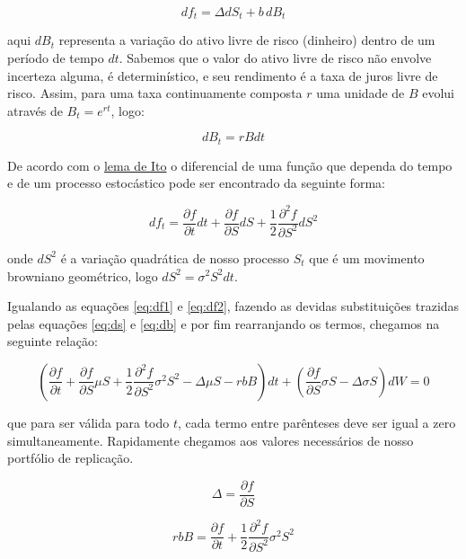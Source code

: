 \documentclass[]{book}
\begin{document}
\begin{equation}
df_t=\Delta dS_t+b\,dB_t 
\label{eq:df1}
\end{equation}

aqui \(dB_t\) representa a variação do ativo livre de risco (dinheiro)
dentro de um período de tempo \(dt\). Sabemos que o valor do ativo livre
de risco não envolve incerteza alguma, é determinístico, e seu
rendimento é a taxa de juros livre de risco. Assim, para uma taxa
continuamente composta \(r\) uma unidade de \(B\) evolui através de
\(B_t=e^{rt}\), logo:

\begin{equation}
dB_t=rBdt
\label{eq:db}
\end{equation}

De acordo com o
\href{https://pt.wikipedia.org/wiki/Lema_de_It\%C5\%8D}{lema de Ito} o
diferencial de uma função que dependa do tempo e de um processo
estocástico pode ser encontrado da seguinte forma:

\begin{equation}
df_t=\frac{\partial f}{\partial t}dt + \frac{\partial f}{\partial S}dS + \frac{1}{2}\frac{\partial^2 f}{\partial S^2}dS^2
\label{eq:df2}
\end{equation}

onde \(dS^2\) é a variação quadrática de nosso processo \(S_t\) que é um
movimento browniano geométrico, logo \(dS^2=\sigma^2S^2dt\).

Igualando as equações \eqref{eq:df1} e \eqref{eq:df2}, fazendo as devidas
substituições trazidas pelas equações \eqref{eq:ds} e \eqref{eq:db} e por
fim rearranjando os termos, chegamos na seguinte relação:

\begin{equation}
\left( \frac{\partial f}{\partial t} + \frac{\partial f}{\partial S}\mu S + \frac{1}{2}\frac{\partial^2 f}{\partial S^2}\sigma^2 S^2 - \Delta\mu S - rbB \right)dt + \left( \frac{\partial f}{\partial S}\sigma S - \Delta \sigma S \right)dW = 0 
\end{equation}

que para ser válida para todo \(t\), cada termo entre parênteses deve
ser igual a zero simultaneamente. Rapidamente chegamos aos valores
necessários de nosso portfólio de replicação.

\begin{equation}
\Delta = \frac{\partial f}{\partial S} 
\label{eq:delta}
\end{equation}

\begin{equation}
rbB = \frac{\partial f}{\partial t}+\frac{1}{2}\frac{\partial^2 f}{\partial S^2}\sigma^2S^2 
\label{eq:rbb1}
\end{equation}
\end{document}
